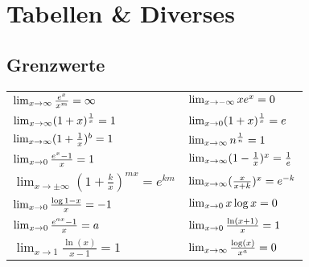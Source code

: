 \clearpage
\section{Tabellen \& Diverses}

\subsection{Grenzwerte}
\renewcommand*{\arraystretch}{2}
\begin{center}
  \begin{tabularx}{\linewidth}{XX}
    \toprule
    $\lim_{x\to\infty} \frac{e^x}{x^m} = \infty$                      & $\lim_{x\to-\infty} xe^x = 0$                        \\
    $\lim_{x\to\infty} (1+x)^{\frac{1}{x}} = 1$                       & $\lim_{x\to 0} (1+x)^{\frac{1}{x}} = e$         \\
    $\lim_{x\to\infty} (1+\frac{1}{x})^b = 1$                         & $\lim_{x\to\infty} n^{\frac{1}{n}} = 1$             \\
    $\lim_{x\to 0} \frac{e^x-1}{x} = 1$                           & $\lim_{x\to\infty} (1-\frac{1}{x})^x = \frac{1}{e}$ \\
    $\lim_{x\to\pm\infty} (1 + \frac{k}{x})^{mx} = e^{km}$ & $\lim_{x\to\infty} (\frac{x}{x+k})^x = e^{-k}$      \\
    $\lim_{x\to 0} \frac{\log 1 - x}{x} = -1$                     & $\lim_{x\to 0} x \log x = 0$                    \\
    $\lim_{x\to 0} \frac{e^{ax}-1}{x} = a$                        & $\lim_{x\to 0} \frac{\ln(x+1)}{x} = 1$          \\
    $\lim_{x\to 1} \frac{\ln(x)}{x-1} = 1$                 & $\lim_{x\to\infty} \frac{\log(x)}{x^a} = 0$         \\
    \bottomrule
  \end{tabularx}
\end{center}

